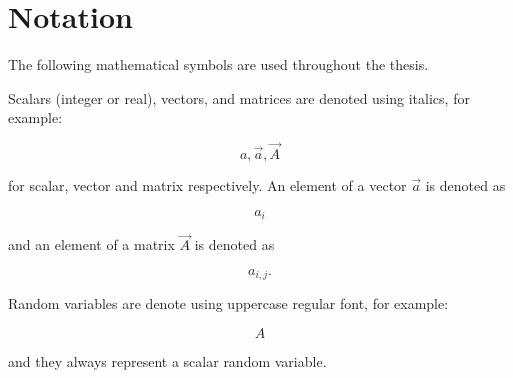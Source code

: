 \chapter*{Notation}

The following mathematical symbols are used throughout the thesis. 

Scalars (integer or real), vectors, and matrices are denoted using italics, for example:

$$
a, \vec{a}, \vec{A}
$$

for scalar, vector and matrix respectively. An element of a vector $\vec{a}$ is denoted as

$$
a_i
$$

and an element of a matrix $\vec{A}$ is denoted as 

$$
a_{i,j}.
$$

Random variables are denote using uppercase regular font, for example:

$$
A
$$ 

and they always represent a scalar random variable.  



